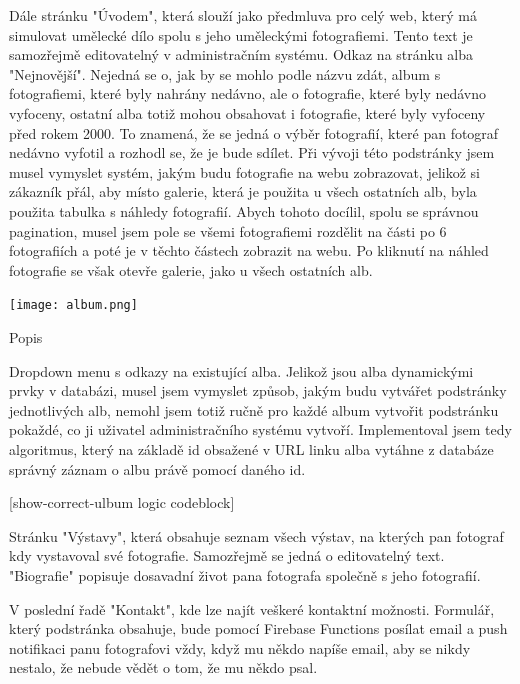 \documentclass[12pt,a4paper]{report}
\begin{document}
  Dále stránku "Úvodem", která slouží jako předmluva pro celý web, který má simulovat umělecké
  dílo spolu s jeho uměleckými fotografiemi. Tento text je samozřejmě editovatelný v
  administračním systému.
  Odkaz na stránku alba "Nejnovější". Nejedná se o, jak by se mohlo podle názvu zdát, album s
  fotografiemi, které byly nahrány nedávno, ale o fotografie, které byly nedávno vyfoceny, ostatní
  alba totiž mohou obsahovat i fotografie, které byly vyfoceny před rokem 2000. To znamená, že se
  jedná o výběr fotografií, které pan fotograf nedávno vyfotil a rozhodl se, že je bude sdílet. Při
  vývoji této podstránky jsem musel vymyslet systém, jakým budu fotografie na webu zobrazovat,
  jelikož si zákazník přál, aby místo galerie, která je použita u všech ostatních alb, byla použita
  tabulka s náhledy fotografií. Abych tohoto docílil, spolu se správnou pagination, musel jsem pole
  se všemi fotografiemi rozdělit na části po 6 fotografiích a poté je v těchto částech zobrazit na
  webu. Po kliknutí na náhled fotografie se však otevře galerie, jako u všech ostatních alb.
  
  \vspace*{0.5cm}
  \noindent\texttt{[image: album.png]}
  \begin{center}
    Popis
  \end{center}
  \vspace*{0.5cm}

  Dropdown menu s odkazy na existující alba. Jelikož jsou alba dynamickými prvky v databázi, musel
  jsem vymyslet způsob, jakým budu vytvářet podstránky jednotlivých alb, nemohl jsem totiž ručně
  pro každé album vytvořit podstránku pokaždé, co ji uživatel administračního systému vytvoří.
  Implementoval jsem tedy algoritmus, který na základě id obsažené v URL linku alba vytáhne z
  databáze správný záznam o albu právě pomocí daného id.

  [show-correct-ulbum logic codeblock]
 
  Stránku "Výstavy", která obsahuje seznam všech výstav, na kterých pan fotograf kdy vystavoval
  své fotografie. Samozřejmě se jedná o editovatelný text.
  "Biografie" popisuje dosavadní život pana fotografa společně s jeho fotografií.
  
  V poslední řadě "Kontakt", kde lze najít veškeré kontaktní možnosti. Formulář, který podstránka
  obsahuje, bude pomocí Firebase Functions posílat email a push notifikaci panu fotografovi vždy,
  když mu někdo napíše email, aby se nikdy nestalo, že nebude vědět o tom, že mu někdo psal.
 
\end{document}
